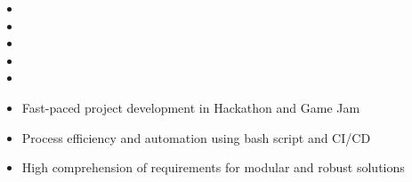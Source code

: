 \begin{itemize}
\item[\scriptsize\color{tech}\faComments] 
\item[\scriptsize\color{tech}\faComments] \par
\divider
\item[\scriptsize\color{tech}\faCode] 
\item[\scriptsize\color{tech}\faCode] \par
\item[\scriptsize\color{tech}\faCode] \par
\end{itemize}

\bigskip
\medskip



\begin{itemize}
	\item[\faAngleRight] Fast-paced project development in Hackathon and Game Jam
	\item[\faAngleRight] Process efficiency and automation using bash script and CI/CD
	\item[\faAngleRight] High comprehension of requirements for modular and robust solutions \par
\end{itemize}

\smallskip
\divider

\hfill
{}\hfill
{}\par
\smallskip
{}\hfill
{}\hfill
{}\hfill
{}\par
